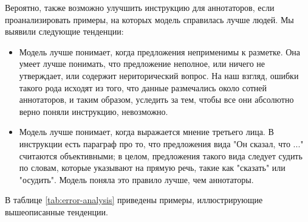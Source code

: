 \documentclass[conference]{IEEEtran}
\begin{document}
Вероятно, также возможно улучшить инструкцию для аннотаторов, если проанализировать примеры, на которых модель справилась лучше людей. Мы выявили следующие тенденции:
\begin{itemize}
    \item Модель лучше понимает, когда предложения неприменимы к разметке. Она умеет лучше понимать, что предложение неполное, или ничего не утверждает, или содержит нериторический вопрос. На наш взгляд, ошибки такого рода исходят из того, что данные размечались около сотней аннотаторов, и таким образом, уследить за тем, чтобы все они абсолютно верно поняли инструкцию, невозможно. 
    \item Модель лучше понимает, когда выражается мнение третьего лица. В инструкции есть параграф про то, что предложения вида "Он сказал, что ..." считаются объективными; в целом, предложения такого вида следует судить по словам, которые указывают на прямую речь, такие как "сказать" или "осудить". Модель поняла это правило лучше, чем аннотаторы.
\end{itemize}
В таблице \ref{tab:error-analysis} приведены примеры, иллюстрирующие вышеописанные тенденции.
\end{document}
